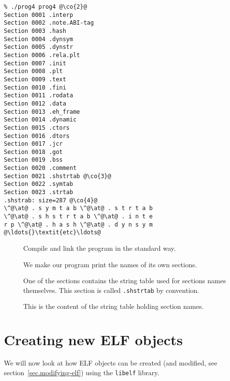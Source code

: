 \documentclass[a4paper]{book}
\makeatletter
\newcommand{\library}[1]{\texttt{#1}}
\newcommand{\parameter}[1]{\texttt{#1}}
\newenvironment{callout}[2][blue]{%
  \begingroup\newcommand{\@cocolor}{#1}%
  \newcommand{\@cogroup}[1]{#2}}{\endgroup}
\newcommand{\@co}[1]{\framebox{\textbf{\color{\@cocolor}#1}}}
\newcommand{\co}[1]{%
  \hypertarget{\@cogroup.#1.co}{%
    \hyperlink{\@cogroup.#1.cr}{\@co{#1}}}}
\newcommand{\coref}[1]{%
  \hypertarget{\@cogroup.#1.cr}{%
    \hyperlink{\@cogroup.#1.co}{\@co{#1}}}}
\makeatother
\begin{document}
\begin{callout}[red]{scr4}
  \newcommand{\at}{@}
  \begin{lstlisting}[language={}, basicstyle=\small\ttfamily,
      label=scr.prog4, caption=Compiling and Running prog4]
% cc -o prog4 prog4.c -lelf @\co{1}@
% ./prog4 prog4 @\co{2}@
Section 0001 .interp
Section 0002 .note.ABI-tag
Section 0003 .hash
Section 0004 .dynsym
Section 0005 .dynstr
Section 0006 .rela.plt
Section 0007 .init
Section 0008 .plt
Section 0009 .text
Section 0010 .fini
Section 0011 .rodata
Section 0012 .data
Section 0013 .eh_frame
Section 0014 .dynamic
Section 0015 .ctors
Section 0016 .dtors
Section 0017 .jcr
Section 0018 .got
Section 0019 .bss
Section 0020 .comment
Section 0021 .shstrtab @\co{3}@
Section 0022 .symtab
Section 0023 .strtab
.shstrab: size=287 @\co{4}@
\^@\at@ . s y m t a b \^@\at@ . s t r t a b
\^@\at@ . s h s t r t a b \^@\at@ . i n t e
r p \^@\at@ . h a s h \^@\at@ . d y n s y m
@\ldots{}\textit{etc}\ldots@
  \end{lstlisting}

  \begin{description}
  \item[\coref{1}] Compile and link the program in the standard way.
  \item[\coref{2}] We make our program print the names of its own
    sections.
  \item[\coref{3}] One of the sections contains the string table used
    for sections names themselves.  This section is called
    \parameter{.shstrtab} by convention.
  \item[\coref{4}] This is the content of the string table holding
    section names.
  \end{description}
\end{callout}

\chapter{Creating new ELF objects}\label{chap.creating-elf}

We will now look at how ELF objects can be created (and modified, see
section~\vref{sec.modifying-elf}) using the \library{libelf}
library.
\end{document}
